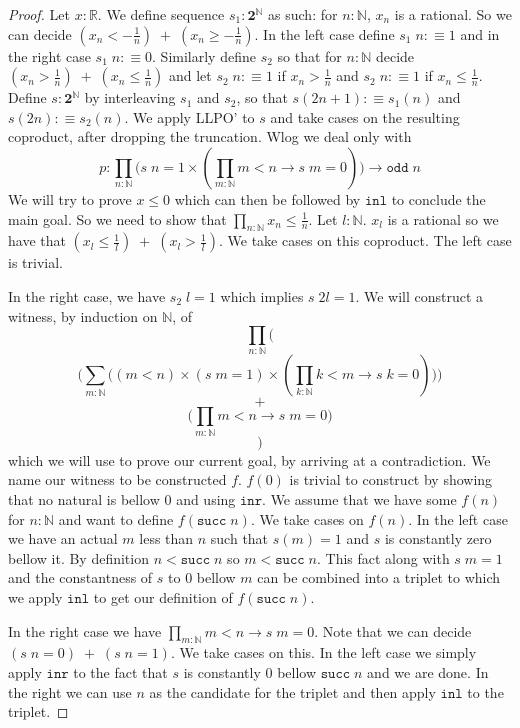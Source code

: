 \documentclass[12pt]{report}
\theoremstyle{definition}
\begin{document}
\begin{proof}
Let $x : \mathbb{R}$. 
We define sequence $s_{1} : \mathbf{2}^\mathbb{N}$ as such: for $n : \mathbb{N}$, $x_n$ is a rational. 
So we can decide $(x_n < -\frac{1}{n})\;+\;(x_n \geq -\frac{1}{n})$. 
In the left case define $s_1\; n :\equiv 1$ and in the right case $s_1\; n :\equiv 0$. 
Similarly define $s_2$ so that for $n : \mathbb{N}$ decide $(x_n > \frac{1}{n})\;+\;(x_n \leq \frac{1}{n})$ and let $s_2\;n:\equiv 1$ if $x_n > \frac{1}{n}$ and $s_2\;n :\equiv 1$ if 
$x_n \leq \frac{1}{n}$. 
Define $s : \mathbf{2}^\mathbb{N}$ by interleaving $s_1$ and $s_2$, so that $s(2n+1) :\equiv s_1(n)$ and $s(2n) :\equiv s_2(n)$. 
We apply LLPO' to $s$ and take cases on the resulting coproduct, after dropping the truncation. 
Wlog we deal only with 
$$p : \prod_{n : \mathbb{N}} \big( s\;n = 1 \times (\prod_{m : \mathbb{N}} m < n \rightarrow s\;m=0) \big) \rightarrow \mathtt{odd}\;n$$
We will try to prove $x \leq 0$ which can then be followed by $\mathtt{inl}$ to conclude the main goal. 
So we need to show that $\prod_{n : \mathbb{N}}x_n \leq \frac{1}{n}$. 
Let $l : \mathbb{N}$. $x_l$ is a rational so we have that $(x_l \leq \frac{1}{l})\;+\;(x_l > \frac{1}{l})$. 
We take cases on this coproduct. The left case is trivial. 

In the right case, we have $s_2\;l = 1$ which implies $s\;2l = 1$. 
We will construct a witness, by induction on $\mathbb{N}$, of 
$$\prod_{n : \mathbb{N}} \bigg($$
$$\Big(\sum_{m : \mathbb{N}}\big( (m < n) \times (s\;m = 1) \times (\prod_{k : \mathbb{N}} k < m \rightarrow s\;k = 0)\big)\Big)$$
$$+$$
$$ \big( \prod_{ m : \mathbb{N}} m < n \rightarrow s\;m = 0 \big) $$
$$\bigg)$$
which we will use to prove our current goal, by arriving at a contradiction. 
We name our witness to be constructed $f$. 
$f(0)$ is trivial to construct by showing that no natural is bellow $0$ and using $\mathtt{inr}$. 
We assume that we have some $f(n)$ for $n : \mathbb{N}$ and want to define $f(\mathtt{succ}\; n)$. 
We take cases on $f(n)$. 
In the left case we have an actual $m$ less than $n$ such that $s(m) = 1$ and $s$ is constantly zero bellow it. 
By definition $n < \mathtt{succ}\;n$ so $m < \mathtt{succ}\;n$. 
This fact along with $s\;m = 1$ and the constantness of $s$ to $0$ bellow $m$ can be combined into a triplet to which we apply $\mathtt{inl}$ to get our definition of $f(\mathtt{succ}\; n)$. 

In the right case we have $\prod_{ m : \mathbb{N}} m < n \rightarrow s\;m = 0$. 
Note that we can decide $(s\;n = 0)\;+\;(s\;n = 1)$. 
We take cases on this. 
In the left case we simply apply $\mathtt{inr}$ to the fact that $s$ is constantly $0$ bellow $\mathtt{succ}\;n$ and we are done. 
In the right we can use $n$ as the candidate for the triplet and then apply $\mathtt{inl}$ to the triplet. 


\end{proof}
\end{document}
